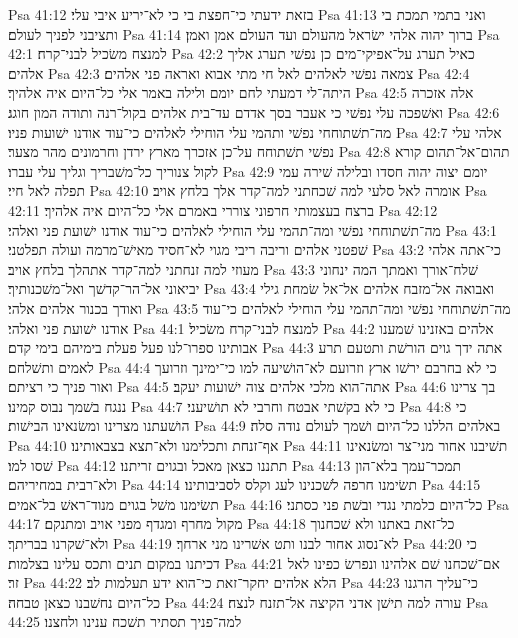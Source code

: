 Psa 41:12  בזאת ידעתי כי־חפצת בי כי לא־יריע איבי עלי׃
Psa 41:13  ואני בתמי תמכת בי ותציבני לפניך לעולם׃
Psa 41:14  ברוך יהוה אלהי ישׂראל מהעולם ועד העולם אמן ואמן׃
Psa 42:1  למנצח משׂכיל לבני־קרח׃
Psa 42:2  כאיל תערג על־אפיקי־מים כן נפשׁי תערג אליך אלהים׃
Psa 42:3  צמאה נפשׁי לאלהים לאל חי מתי אבוא ואראה פני אלהים׃
Psa 42:4  היתה־לי דמעתי לחם יומם ולילה באמר אלי כל־היום איה אלהיך׃
Psa 42:5  אלה אזכרה ואשׁפכה עלי נפשׁי כי אעבר בסך אדדם עד־בית אלהים בקול־רנה ותודה המון חוגג׃
Psa 42:6  מה־תשׁתוחחי נפשׁי ותהמי עלי הוחילי לאלהים כי־עוד אודנו ישׁועות פניו׃
Psa 42:7  אלהי עלי נפשׁי תשׁתוחח על־כן אזכרך מארץ ירדן וחרמונים מהר מצער׃
Psa 42:8  תהום־אל־תהום קורא לקול צנוריך כל־משׁבריך וגליך עלי עברו׃
Psa 42:9  יומם יצוה יהוה חסדו ובלילה שׁירה עמי תפלה לאל חיי׃
Psa 42:10  אומרה לאל סלעי למה שׁכחתני למה־קדר אלך בלחץ אויב׃
Psa 42:11  ברצח בעצמותי חרפוני צוררי באמרם אלי כל־היום איה אלהיך׃
Psa 42:12  מה־תשׁתוחחי נפשׁי ומה־תהמי עלי הוחילי לאלהים כי־עוד אודנו ישׁועת פני ואלהי׃
Psa 43:1  שׁפטני אלהים וריבה ריבי מגוי לא־חסיד מאישׁ־מרמה ועולה תפלטני׃
Psa 43:2  כי־אתה אלהי מעוזי למה זנחתני למה־קדר אתהלך בלחץ אויב׃
Psa 43:3  שׁלח־אורך ואמתך המה ינחוני יביאוני אל־הר־קדשׁך ואל־משׁכנותיך׃
Psa 43:4  ואבואה אל־מזבח אלהים אל־אל שׂמחת גילי ואודך בכנור אלהים אלהי׃
Psa 43:5  מה־תשׁתוחחי נפשׁי ומה־תהמי עלי הוחילי לאלהים כי־עוד אודנו ישׁועת פני ואלהי׃
Psa 44:1  למנצח לבני־קרח משׂכיל׃
Psa 44:2  אלהים באזנינו שׁמענו אבותינו ספרו־לנו פעל פעלת בימיהם בימי קדם׃
Psa 44:3  אתה ידך גוים הורשׁת ותטעם תרע לאמים ותשׁלחם׃
Psa 44:4  כי לא בחרבם ירשׁו ארץ וזרועם לא־הושׁיעה למו כי־ימינך וזרועך ואור פניך כי רציתם׃
Psa 44:5  אתה־הוא מלכי אלהים צוה ישׁועות יעקב׃
Psa 44:6  בך צרינו ננגח בשׁמך נבוס קמינו׃
Psa 44:7  כי לא בקשׁתי אבטח וחרבי לא תושׁיעני׃
Psa 44:8  כי הושׁעתנו מצרינו ומשׂנאינו הבישׁות׃
Psa 44:9  באלהים הללנו כל־היום ושׁמך לעולם נודה סלה׃
Psa 44:10  אף־זנחת ותכלימנו ולא־תצא בצבאותינו׃
Psa 44:11  תשׁיבנו אחור מני־צר ומשׂנאינו שׁסו למו׃
Psa 44:12  תתננו כצאן מאכל ובגוים זריתנו׃
Psa 44:13  תמכר־עמך בלא־הון ולא־רבית במחיריהם׃
Psa 44:14  תשׂימנו חרפה לשׁכנינו לעג וקלס לסביבותינו׃
Psa 44:15  תשׂימנו משׁל בגוים מנוד־ראשׁ בל־אמים׃
Psa 44:16  כל־היום כלמתי נגדי ובשׁת פני כסתני׃
Psa 44:17  מקול מחרף ומגדף מפני אויב ומתנקם׃
Psa 44:18  כל־זאת באתנו ולא שׁכחנוך ולא־שׁקרנו בבריתך׃
Psa 44:19  לא־נסוג אחור לבנו ותט אשׁרינו מני ארחך׃
Psa 44:20  כי דכיתנו במקום תנים ותכס עלינו בצלמות׃
Psa 44:21  אם־שׁכחנו שׁם אלהינו ונפרשׂ כפינו לאל זר׃
Psa 44:22  הלא אלהים יחקר־זאת כי־הוא ידע תעלמות לב׃
Psa 44:23  כי־עליך הרגנו כל־היום נחשׁבנו כצאן טבחה׃
Psa 44:24  עורה למה תישׁן אדני הקיצה אל־תזנח לנצח׃
Psa 44:25  למה־פניך תסתיר תשׁכח ענינו ולחצנו׃
